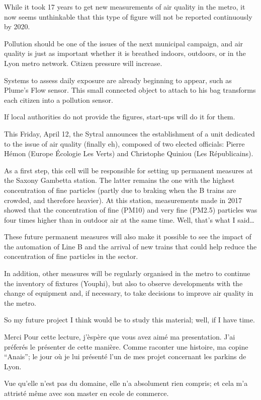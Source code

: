 \documentclass[11pt]{article}
\begin{document}
While it took 17 years to get new measurements of air quality in the
metro, it now seems unthinkable that this type of figure will not be
reported continuously by 2020.

Pollution should be one of the issues of the next municipal campaign,
and air quality is just as important whether it is breathed indoors,
outdoors, or in the Lyon metro network. Citizen pressure will increase.

Systems to assess daily exposure are already beginning to appear, such
as Plume's Flow sensor. This small connected object to attach to his bag
transforms each citizen into a pollution sensor.

If local authorities do not provide the figures, start-ups will do it
for them.

This Friday, April 12, the Sytral announces the establishment of a unit
dedicated to the issue of air quality (finally eh), composed of two
elected officials: Pierre Hémon (Europe Écologie Les Verts) and
Christophe Quiniou (Les Républicains).

As a first step, this cell will be responsible for setting up permanent
measures at the Saxony Gambetta station. The latter remains the one with
the highest concentration of fine particles (partly due to braking when
the B trains are crowded, and therefore heavier). At this station,
measurements made in 2017 showed that the concentration of fine (PM10)
and very fine (PM2.5) particles was four times higher than in outdoor
air at the same time. Well, that's what I said\ldots{}

These future permanent measures will also make it possible to see the
impact of the automation of Line B and the arrival of new trains that
could help reduce the concentration of fine particles in the sector.

In addition, other measures will be regularly organised in the metro to
continue the inventory of fixtures (Youphi), but also to observe
developments with the change of equipment and, if necessary, to take
decisions to improve air quality in the metro.

So my future project I think would be to study this material; well, if I
have time.

    Merci Pour cette lecture, j'èspère que vous avez aimé ma presentation.
J'ai préferés le présenter de cette manière. Comme raconter une
histoire, ma copine ``Anais''; le jour où je lui présenté l'un de mes
projet concernant les parkins de Lyon.

Vue qu'elle n'est pas du domaine, elle n'a absolument rien compris; et
cela m'a attristé même avec son master en ecole de commerce.
\end{document}
